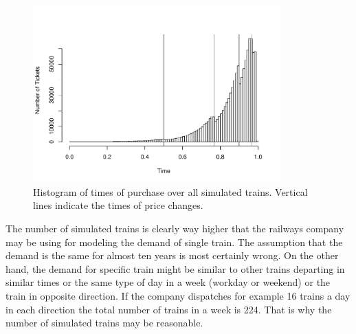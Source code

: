 \begin{figure}[t]
	\centering
	\includegraphics[width=0.85\textwidth]{figures/histTimes.pdf}
	\caption{Histogram of times of purchase over all simulated trains. Vertical lines indicate the times of price changes.}
	\label{fig:histTimes}
\end{figure}



The number of simulated trains is clearly way higher that the railways company may be using for modeling the demand of single train. The assumption that the demand is the same for almost ten years is most certainly wrong. On the other hand, the demand for specific train might be similar to other trains departing in similar times or the same type of day in a week (workday or weekend) or the train in opposite direction. If the company dispatches for example 16 trains a day in each direction the total number of trains in a week is 224. That is why the number of simulated trains may be reasonable.


